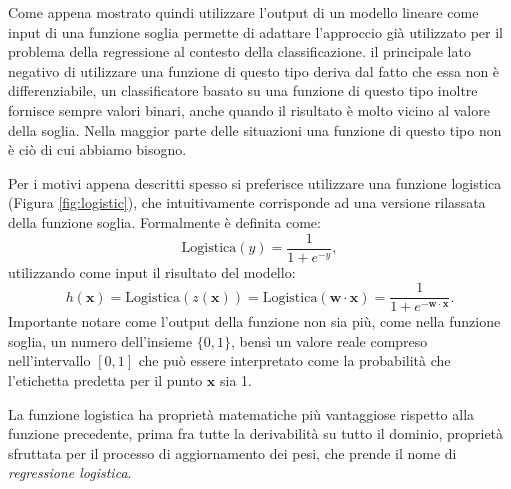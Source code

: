 \documentclass[../../main.tex]{subfiles}
\begin{document}
    Come appena mostrato quindi utilizzare l'output di un modello lineare come input di una funzione soglia permette di adattare l'approccio già utilizzato per il problema della regressione al contesto della classificazione. il principale lato negativo di utilizzare una funzione di questo tipo deriva dal fatto che essa non è differenziabile, un classificatore basato su una funzione di questo tipo inoltre fornisce sempre valori binari, anche quando il risultato è molto vicino al valore della soglia. Nella maggior parte delle situazioni una funzione di questo tipo non è ciò di cui abbiamo bisogno.

    Per i motivi appena descritti spesso si preferisce utilizzare una funzione logistica (Figura \ref{fig:logistic}), che intuitivamente corrisponde ad una versione rilassata della funzione soglia. Formalmente è definita come:
    \[ \text{Logistica}(y) = \frac{1}{1 + e^{-y}}, \]
    utilizzando come input il risultato del modello:
    \[h(\boldsymbol{x}) = \text{Logistica}(z(\boldsymbol{x})) = \text{Logistica}(\boldsymbol{w} \cdot \boldsymbol{x}) = \frac{1}{1 + e^{- \boldsymbol{w \cdot x}}} .\]
    Importante notare come l'output della funzione non sia più, come nella funzione soglia, un numero dell'insieme $\{0,1\}$, bensì un valore reale compreso nell'intervallo $[0, 1]$ che può essere interpretato come la probabilità che l'etichetta predetta per il punto $\boldsymbol{x}$ sia 1.

    La funzione logistica ha proprietà matematiche più vantaggiose rispetto alla funzione precedente, prima fra tutte la derivabilità su tutto il dominio, proprietà sfruttata per il processo di aggiornamento dei pesi, che prende il nome di \textit{regressione logistica}. 
    
\end{document}
